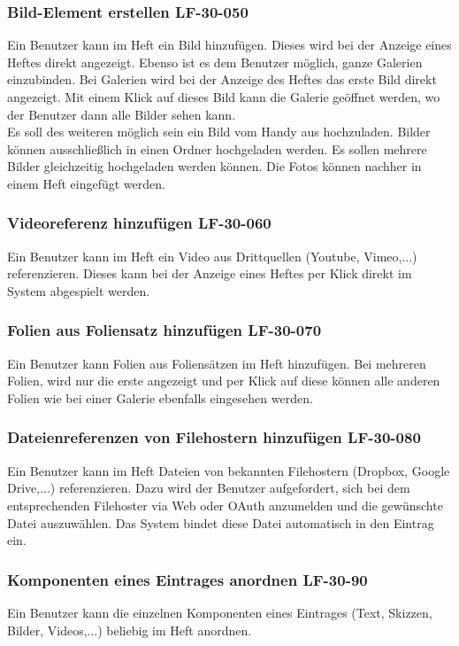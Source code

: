 \documentclass[12pt,a4paper,oneside,ngerman]{scrartcl}
\begin{document}
\subsubsection{Bild-Element erstellen \hfill LF-30-050}
Ein Benutzer kann im Heft ein Bild hinzufügen. Dieses wird bei der Anzeige eines Heftes direkt angezeigt. Ebenso ist es dem Benutzer möglich, ganze Galerien einzubinden. Bei Galerien wird bei der Anzeige des Heftes das erste Bild direkt angezeigt. Mit einem Klick auf dieses Bild kann die Galerie geöffnet werden, wo der Benutzer dann alle Bilder sehen kann.\\

Es soll des weiteren möglich sein ein Bild vom Handy aus hochzuladen. Bilder können ausschließlich in einen Ordner hochgeladen werden. Es sollen mehrere Bilder gleichzeitig hochgeladen werden können. Die Fotos können nachher in einem Heft eingefügt werden.

\subsubsection{Videoreferenz hinzufügen \hfill LF-30-060}
Ein Benutzer kann im Heft ein Video aus Drittquellen (Youtube, Vimeo,...)  referenzieren. Dieses kann bei der Anzeige eines Heftes per Klick direkt im System abgespielt werden.

\subsubsection{Folien aus Foliensatz hinzufügen \hfill LF-30-070}
Ein Benutzer kann Folien aus Foliensätzen im Heft hinzufügen. Bei mehreren Folien, wird nur die erste angezeigt und per Klick auf diese können alle anderen Folien wie bei einer Galerie ebenfalls eingesehen werden.

\subsubsection{Dateienreferenzen von Filehostern hinzufügen \hfill LF-30-080}
Ein Benutzer kann im Heft Dateien von bekannten Filehostern (Dropbox, Google Drive,...) referenzieren. Dazu wird der Benutzer aufgefordert, sich bei dem entsprechenden Filehoster via Web oder OAuth anzumelden und die gewünschte Datei auszuwählen. Das System bindet diese Datei automatisch in den Eintrag ein.

\subsubsection{Komponenten eines Eintrages anordnen \hfill LF-30-90}
Ein Benutzer kann die einzelnen Komponenten eines Eintrages (Text, Skizzen, Bilder, Videos,...) beliebig im Heft anordnen.
\end{document}
